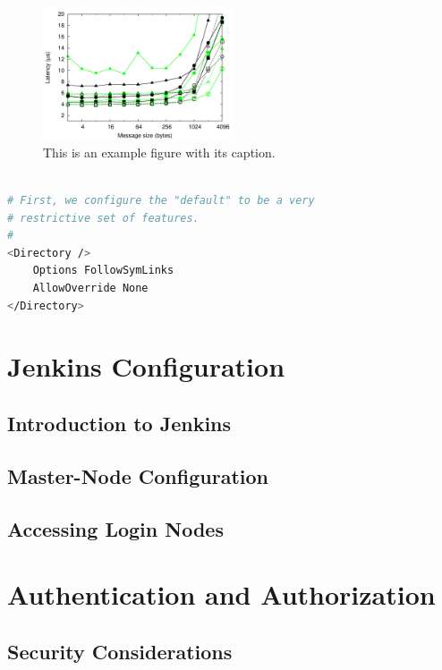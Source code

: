 \documentclass[10pt, conference, compsocconf]{IEEEtran}
\begin{document}
{\begin{figure}
\centering
\includegraphics[width=0.5\textwidth]{example}
\caption{This is an example figure with its caption.}
\label{fig:example}
\end{figure}

\begin{lstlisting}[float,frame=tb,captionpos=t,language=bash,caption={Apache Configuration Example}, label=lst:apacheconfig]

# First, we configure the "default" to be a very 
# restrictive set of features.  
#
<Directory />
    Options FollowSymLinks
    AllowOverride None  
</Directory>

\end{lstlisting}

\section{Jenkins Configuration}
\label{sec:JenkinsConfiguration}

\subsection{Introduction to Jenkins}
\subsection{Master-Node Configuration}
\subsection{Accessing Login Nodes}


\section{Authentication and Authorization}
\label{sec:AuthenticationAuthorization}

\subsection{Security Considerations}
}
\end{document}
